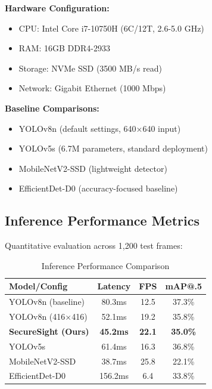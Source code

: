 \documentclass[conference]{IEEEtran}
\begin{document}
\textbf{Hardware Configuration:}
\begin{itemize}
    \item CPU: Intel Core i7-10750H (6C/12T, 2.6-5.0 GHz)
    \item RAM: 16GB DDR4-2933
    \item Storage: NVMe SSD (3500 MB/s read)
    \item Network: Gigabit Ethernet (1000 Mbps)
\end{itemize}

\textbf{Baseline Comparisons:}
\begin{itemize}
    \item YOLOv8n (default settings, 640×640 input)
    \item YOLOv5s (6.7M parameters, standard deployment)
    \item MobileNetV2-SSD (lightweight detector)
    \item EfficientDet-D0 (accuracy-focused baseline)
\end{itemize}

\subsection{Inference Performance Metrics}
Quantitative evaluation across 1,200 test frames:

\begin{table}[htbp]
\caption{Inference Performance Comparison}
\begin{center}
\begin{tabular}{|l|c|c|c|}
\hline
\textbf{Model/Config} & \textbf{Latency} & \textbf{FPS} & \textbf{mAP@.5} \\
\hline
YOLOv8n (baseline) & 80.3ms & 12.5 & 37.3\% \\
\hline
YOLOv8n (416×416) & 52.1ms & 19.2 & 35.8\% \\
\hline
\textbf{SecureSight (Ours)} & \textbf{45.2ms} & \textbf{22.1} & \textbf{35.0\%} \\
\hline
YOLOv5s & 61.4ms & 16.3 & 36.8\% \\
\hline
MobileNetV2-SSD & 38.7ms & 25.8 & 22.1\% \\
\hline
EfficientDet-D0 & 156.2ms & 6.4 & 33.8\% \\
\hline
\end{tabular}
\label{tab:performance}
\end{center}
\end{table}
\end{document}

